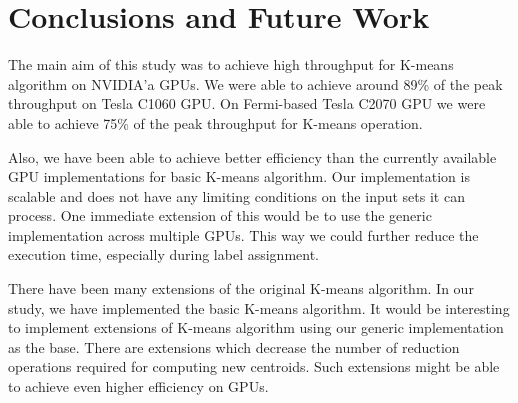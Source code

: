\chapter{Conclusions and Future Work}
The main aim of this study was to achieve high throughput for K-means algorithm on NVIDIA'a GPUs. We were able to achieve around 89\% of the peak throughput on Tesla C1060 GPU. On Fermi-based Tesla C2070 GPU we were able to achieve 75\% of the peak throughput for K-means operation.

Also, we have been able to achieve better efficiency than the currently available GPU implementations for basic K-means algorithm. Our implementation is scalable and does not have any limiting conditions on the input sets it can process. One immediate extension of this would be to use the generic implementation across multiple GPUs. This way we could further reduce the execution time, especially during label assignment.

There have been many extensions of the original K-means algorithm. In our study, we have implemented the basic K-means algorithm. It would be interesting to implement extensions of K-means algorithm using our generic implementation as the base. There are extensions which decrease the number of reduction operations required for computing new centroids. Such extensions might be able to achieve even higher efficiency on GPUs.